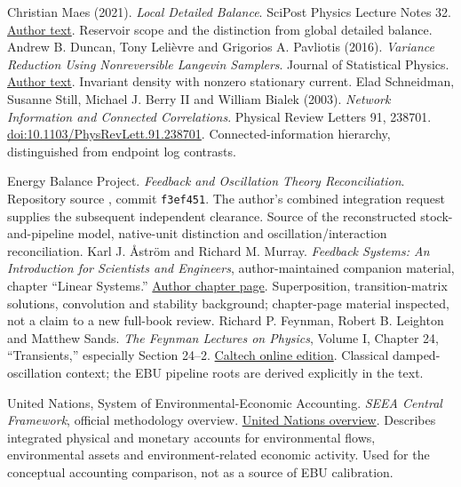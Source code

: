  Christian Maes (2021). \emph{Local Detailed Balance}. SciPost Physics Lecture Notes 32. \href{https://arxiv.org/abs/2011.09200}{Author text}. Reservoir scope and the distinction from global detailed balance.
 Andrew B. Duncan, Tony Leli\`evre and Grigorios A. Pavliotis (2016). \emph{Variance Reduction Using Nonreversible Langevin Samplers}. Journal of Statistical Physics. \href{https://arxiv.org/abs/1506.04934}{Author text}. Invariant density with nonzero stationary current.
 Elad Schneidman, Susanne Still, Michael J. Berry II and William Bialek (2003). \emph{Network Information and Connected Correlations}. Physical Review Letters 91, 238701. \href{https://doi.org/10.1103/PhysRevLett.91.238701}{doi:10.1103/PhysRevLett.91.238701}. Connected-information hierarchy, distinguished from endpoint log contrasts.

 Energy Balance Project. \emph{Feedback and Oscillation Theory Reconciliation}. Repository source , commit \texttt{f3ef451}. The author's combined integration request supplies the subsequent independent clearance. Source of the reconstructed stock-and-pipeline model, native-unit distinction and oscillation/interaction reconciliation.
 Karl J. \AA{}str\"om and Richard M. Murray. \emph{Feedback Systems: An Introduction for Scientists and Engineers}, author-maintained companion material, chapter ``Linear Systems.'' \href{https://www.fbswiki.org/wiki/index.php/Linear_Systems}{Author chapter page}. Superposition, transition-matrix solutions, convolution and stability background; chapter-page material inspected, not a claim to a new full-book review.
 Richard P. Feynman, Robert B. Leighton and Matthew Sands. \emph{The Feynman Lectures on Physics}, Volume I, Chapter 24, ``Transients,'' especially Section 24--2. \href{https://www.feynmanlectures.caltech.edu/I_24.html}{Caltech online edition}. Classical damped-oscillation context; the EBU pipeline roots are derived explicitly in the text.

 United Nations, System of Environmental-Economic Accounting. \emph{SEEA Central Framework}, official methodology overview. \href{https://seea.un.org/en/methodology/seea-central-framework}{United Nations overview}. Describes integrated physical and monetary accounts for environmental flows, environmental assets and environment-related economic activity. Used for the conceptual accounting comparison, not as a source of EBU calibration.
